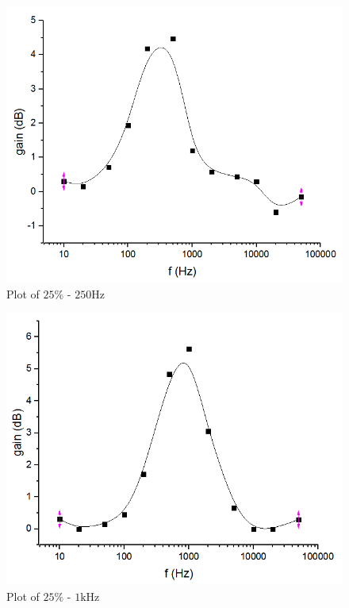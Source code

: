 \begin{figure}
	\centering
	\begin{framed}
		\includegraphics[width=\linewidth]{images/00.PNG}
		\caption{Plot of $25\%$ - $250\si{\hertz}$}
		\label{fig:plot00}
	\end{framed}
\end{figure}

\begin{figure}
	\centering
	\begin{framed}
		\includegraphics[width=\linewidth]{images/01.PNG}
		\caption{Plot of $25\%$ - $1\si{\kilo\hertz}$}
		\label{fig:plot01}
	\end{framed}
\end{figure}

